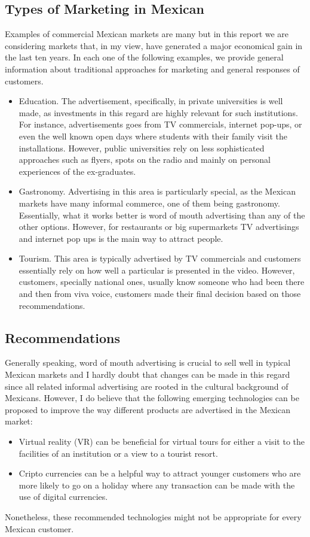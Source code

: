 \documentclass[10pt]{article}
\begin{document}


\subsection{Types of Marketing in Mexican}
Examples of commercial Mexican markets are many but in this report
we are considering markets that, in my view, have generated a 
major economical gain in the last ten years. 
In each one of the following examples, 
we provide general information about traditional approaches 
for marketing and general responses of customers.
\begin{itemize}
\item Education. The advertisement, specifically, in private universities 
is well made, as investments in this regard are highly relevant for such 
institutions.
For instance, advertisements goes from TV commercials, internet pop-ups,
or even the well known open days where students with their family visit 
the installations.
However, public universities rely on less sophisticated approaches such 
as flyers, spots on the radio and mainly on personal experiences of the ex-graduates.
\item Gastronomy. Advertising in this area is particularly special,
as the Mexican markets have many informal commerce, one of them being gastronomy.
Essentially, what it works better is word of mouth advertising than any of the 
other options. However, for restaurants or big supermarkets
TV advertisings and internet pop ups is the main way to attract people.
\item Tourism. This area is typically advertised by TV commercials
 and customers essentially rely on how well a particular is presented in the video. 
However, customers, specially national ones, usually know someone 
who had been there and then from viva voice, customers 
made their final decision based on those recommendations.
\end{itemize}

\subsection{Recommendations}
Generally speaking, word of mouth advertising is crucial to sell well
in typical Mexican markets and I hardly doubt that changes can be made
in this regard since all related informal advertising are rooted in 
the cultural background of Mexicans. However, I do believe that 
the following emerging technologies can be proposed to improve 
the way different products are advertised in the Mexican market:
\begin{itemize}
\item Virtual reality (VR) can be beneficial for virtual tours
for either a visit to the facilities of an institution
or a view to a tourist resort.
\item Cripto currencies can be a helpful way to attract younger
customers who are more likely to go on a holiday where 
any transaction can be made with the use of digital currencies.
\end{itemize}
Nonetheless, these recommended technologies might not be appropriate
for every Mexican customer.
\end{document}

